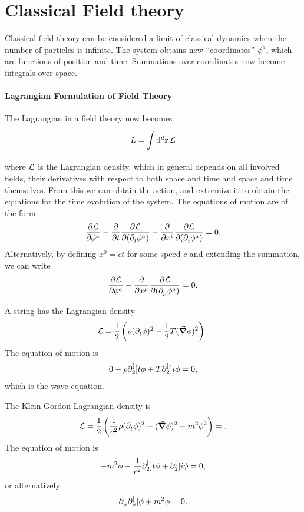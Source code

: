 \section{Classical Field theory}

Classical field theory can be considered a limit of classical dynamics when the number of particles is infinite. The system obtains new ``coordinates'' $\phi^{a}$, which are functions of position and time. Summations over coordinates now become integrals over space.

\paragraph{Lagrangian Formulation of Field Theory}
The Lagrangian in a field theory now becomes
\begin{align*}
	L = \int\limits_{}^{}\dd[d]{\vb{r}}\mathcal{L}
\end{align*}
where $\mathcal{L}$ is the Lagrangian density, which in general depends on all involved fields, their derivatives with respect to both space and time and space and time themselves. From this we can obtain the action, and extremize it to obtain the equations for the time evolution of the system. The equations of motion are of the form
\begin{align*}
	\pdv{\ensuremath{\mathcal{L}}}{\phi^{a}} - \pdv{t}\pdv{\ensuremath{\mathcal{L}}}{(\ensuremath{\partial^{}_{t}}{\phi^{a}})} - \pdv{x^{i}}\pdv{\ensuremath{\mathcal{L}}}{(\ensuremath{\partial^{}_{i}}{\phi^{a}})} = 0.
\end{align*}
Alternatively, by defining $x^{0} = ct$ for some speed $c$ and extending the summation, we can write
\begin{align*}
	\pdv{\ensuremath{\mathcal{L}}}{\phi^{a}} - \pdv{x^{\mu}}\pdv{\ensuremath{\mathcal{L}}}{(\ensuremath{\partial^{}_{\mu}}{\phi^{a}})} = 0.
\end{align*}

A string has the Lagrangian density
\begin{align*}
	\mathcal{L} = \frac{1}{2}\left(\rho(\partial^{}_{t}{\phi})^{2} - \frac{1}{2}T(\grad{\phi})^{2}\right).
\end{align*}
The equation of motion is
\begin{align*}
	0 - \rho\partial^{[}_{2}]{t}{\phi} + T\partial^{[}_{2}]{i}{\phi} = 0,
\end{align*}
which is the wave equation.

The Klein-Gordon Lagrangian density is
\begin{align*}
	\mathcal{L} = \frac{1}{2}\left(\frac{1}{c^{2}}\rho(\partial^{}_{t}{\phi})^{2} - (\grad{\phi})^{2} - m^{2}\phi^{2}\right) = .
\end{align*}
The equation of motion is
\begin{align*}
	-m^{2}\phi - \frac{1}{c^{2}}\partial^{[}_{2}]{t}{\phi} + \partial^{[}_{2}]{i}{\phi} = 0,
\end{align*}
or alternatively
\begin{align*}
	\partial^{}_{\mu}{\partial^{[}_{\mu}]{}{\phi}} + m^{2}\phi = 0.
\end{align*}

